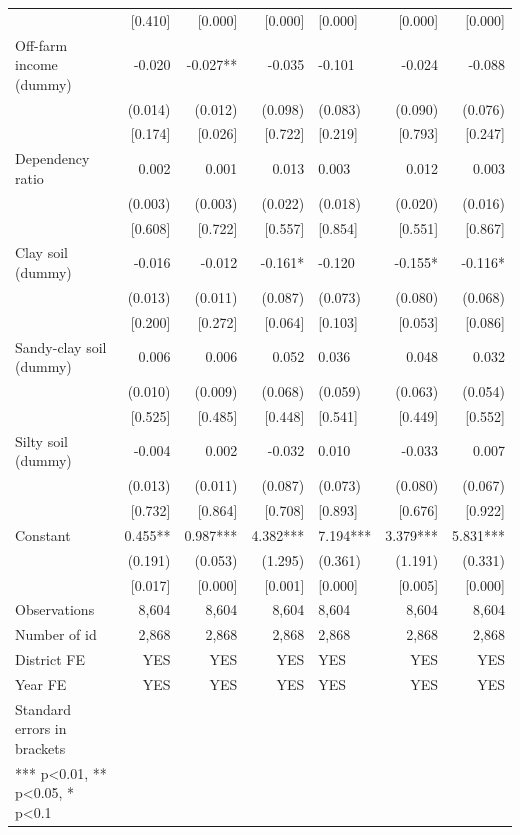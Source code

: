 \documentclass[
]{article}
\begin{document}
\begin{ThreePartTable}
\begin{longtable}[t]{lrrrlrr}
 & {}[0.410] & {}[0.000] & {}[0.000] & {}[0.000] & {}[0.000] & {}[0.000]\\
Off-farm income (dummy) & -0.020 & -0.027** & -0.035 & -0.101 & -0.024 & -0.088\\
 & (0.014) & (0.012) & (0.098) & (0.083) & (0.090) & (0.076)\\
 & {}[0.174] & {}[0.026] & {}[0.722] & {}[0.219] & {}[0.793] & {}[0.247]\\
Dependency ratio & 0.002 & 0.001 & 0.013 & 0.003 & 0.012 & 0.003\\
 & (0.003) & (0.003) & (0.022) & (0.018) & (0.020) & (0.016)\\
 & {}[0.608] & {}[0.722] & {}[0.557] & {}[0.854] & {}[0.551] & {}[0.867]\\
Clay soil (dummy) & -0.016 & -0.012 & -0.161* & -0.120 & -0.155* & -0.116*\\
 & (0.013) & (0.011) & (0.087) & (0.073) & (0.080) & (0.068)\\
 & {}[0.200] & {}[0.272] & {}[0.064] & {}[0.103] & {}[0.053] & {}[0.086]\\
Sandy-clay soil (dummy) & 0.006 & 0.006 & 0.052 & 0.036 & 0.048 & 0.032\\
 & (0.010) & (0.009) & (0.068) & (0.059) & (0.063) & (0.054)\\
 & {}[0.525] & {}[0.485] & {}[0.448] & {}[0.541] & {}[0.449] & {}[0.552]\\
Silty soil (dummy) & -0.004 & 0.002 & -0.032 & 0.010 & -0.033 & 0.007\\
 & (0.013) & (0.011) & (0.087) & (0.073) & (0.080) & (0.067)\\
 & {}[0.732] & {}[0.864] & {}[0.708] & {}[0.893] & {}[0.676] & {}[0.922]\\
Constant & 0.455** & 0.987*** & 4.382*** & 7.194*** & 3.379*** & 5.831***\\
 & (0.191) & (0.053) & (1.295) & (0.361) & (1.191) & (0.331)\\
 & {}[0.017] & {}[0.000] & {}[0.001] & {}[0.000] & {}[0.005] & {}[0.000]\\
Observations & 8,604 & 8,604 & 8,604 & 8,604 & 8,604 & 8,604\\
Number of id & 2,868 & 2,868 & 2,868 & 2,868 & 2,868 & 2,868\\
District FE & YES & YES & YES & YES & YES & YES\\
Year FE & YES & YES & YES & YES & YES & YES\\
Standard errors in brackets &  &  &  &  &  & \\
*** p<0.01, ** p<0.05, * p<0.1 &  &  &  &  &  & \\*
\end{longtable}
\end{ThreePartTable}
\endgroup{}
\end{document}
